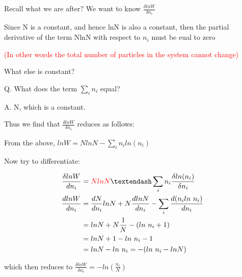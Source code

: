 \documentclass[ignorenonframetext]{beamer}
\begin{document}
\begin{frame}[allowframebreaks]
Recall what we are after? We want to know \(\frac{\delta lnW}{\delta n_i}\)\par\medskip
 
Since N is a constant, and hence lnN is also a constant, then the partial derivative of the  term NlnN with respect to \(n_i\) must be eual to zero\par
\textcolor{red}{(In other words the total number of particles in the system cannot change)}\par\medskip
 
What else is constant?\par
Q. What does the term \(\sum_i n_i \) equal?\par
A. N, which is a constant.\par\medskip

Thus we find that \(\frac{\delta lnW}{\delta n_i}\) reduces as follows:\par\medskip

From the above, \(lnW = NlnN - \sum_i n_i ln(n_i)\)\par\medskip 
Now try to differentiate:\par\medskip

\begin{align*} \frac{\delta lnW}{dn_i} &= \textcolor{red}{NlnN} – \sum_i n_i \frac{\delta ln(n_i)}{\delta n_i}\\
\frac{dlnW}{dn_i} &= \frac{dN}{dn_i}lnN + N \frac{dlnN}{dn_i} - \sum_i \frac{d(n_iln\ n_i)}{dn_i}\\
&= lnN + N\frac{1}{N} - (ln\ n_i +1)\\
&= lnN + 1 - ln\ n_i - 1\\
&= lnN - ln\ n_i = -(ln\ n_i - lnN)\\
\end{align*}
 
which then reduces to \(\frac{\delta lnW}{\delta n_i}  =  - ln\left(\frac{n_i}{N}\right)\)\par   \medskip

\begin{flushright}\par\medskip
\end{flushright}


\end{frame}
\end{document}
